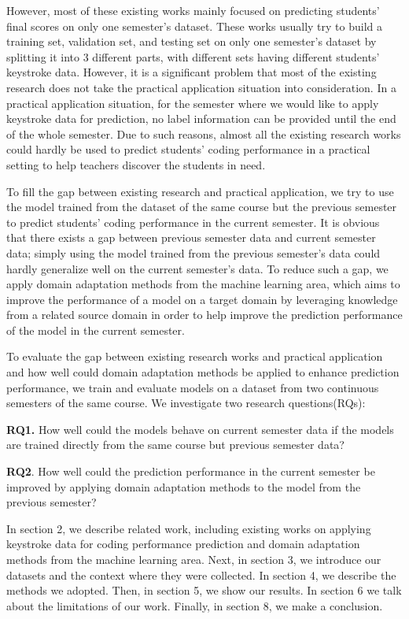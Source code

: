 \documentclass[sigconf,final]{acmart}
\begin{document}
However, most of these existing works mainly focused on predicting students’ final scores on only one semester’s dataset. These works usually try to build a training set, validation set, and testing set on only one semester’s dataset by splitting it into 3 different parts, with different sets having different students’ keystroke data. However, it is a significant problem that most of the existing research does not take the practical application situation into consideration. In a practical application situation, for the semester where we would like to apply keystroke data for prediction, no label information can be provided until the end of the whole semester. Due to such reasons, almost all the existing research works could hardly be used to predict students’ coding performance in a practical setting to help teachers discover the students in need. 

To fill the gap between existing research and practical application, we try to use the model trained from the dataset of the same course but the previous semester to predict students’ coding performance in the current semester. It is obvious that there exists a gap between previous semester data and current semester data; simply using the model trained from the previous semester’s data could hardly generalize well on the current semester’s data. To reduce such a gap, we apply domain adaptation methods from the machine learning area, which aims to improve the performance of a model on a target domain by leveraging knowledge from a related source domain in order to help improve the prediction performance of the model in the current semester. 

To evaluate the gap between existing research works and practical application and how well could domain adaptation methods be applied to enhance prediction performance, we train and evaluate models on a dataset from two continuous semesters of the same course. We investigate two research questions(RQs):

\textbf{RQ1.} How well could the models behave on current semester data if the models are trained directly from the same course but previous semester data?

\textbf{RQ2}. How well could the prediction performance in the current semester be improved by applying domain adaptation methods to the model from the previous semester?

In section 2, we describe related work, including existing works on applying keystroke data for coding performance prediction and domain adaptation methods from the machine learning area. Next, in section 3, we introduce our datasets and the context where they were collected. In section 4, we describe the methods we adopted. Then, in section 5, we show our results. In section 6 we talk about the limitations of our work. Finally, in section 8, we make a conclusion.
\end{document}
